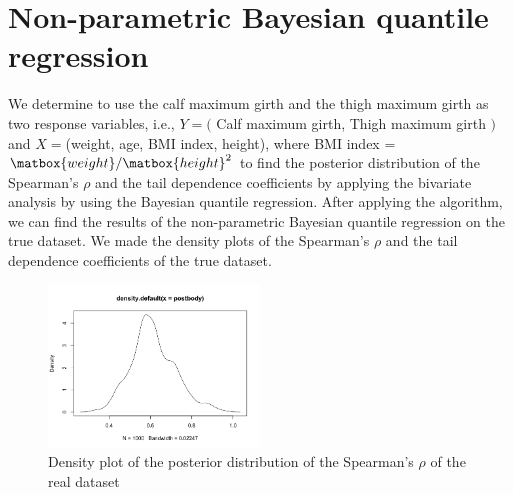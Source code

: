 \documentclass[mstat,12pt]{unswthesis}  %
\numberwithin{equation}{section}
\begin{document}
\section{Non-parametric Bayesian quantile regression}
We determine to use the calf maximum girth and the thigh maximum girth as two response variables, i.e., $Y=($ Calf maximum girth, Thigh maximum girth $)$ and $X=$(weight, age, BMI index, height), where BMI index = $\matbox{weight}/\matbox{height}^2$ to find the posterior distribution of the Spearman's $\rho$ and the tail dependence coefficients by applying the bivariate analysis by using the Bayesian quantile regression. After applying the algorithm, we can find the results of the non-parametric Bayesian quantile regression on the true dataset. We made the density plots of the Spearman's $\rho$ and the tail dependence coefficients of the true dataset. 
\begin{figure}[H]
\centering
\includegraphics[width=0.5\textwidth,height=0.4\textwidth]{postbody.png}
\caption{Density plot of the posterior distribution of the Spearman's $\rho$ of the real dataset}
\end{figure}
\end{document}
